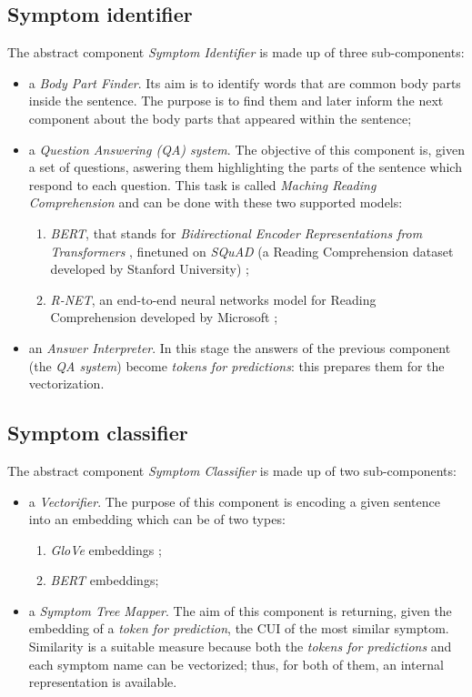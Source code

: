 \subsection*{Symptom identifier}
The abstract component \textit{Symptom Identifier} is made up of three sub-components:
\begin{itemize}
  \item a \textit{Body Part Finder}. Its aim is to identify words that are common body parts inside the sentence. The purpose is to find them and later inform the next component about the body parts that appeared within the sentence;
  \item a \textit{Question Answering (QA) system}. The objective of this component is, given a set of questions, aswering them highlighting the parts of the sentence which respond to each question. This task is called \textit{Maching Reading Comprehension} and can be done with these two supported models:
    \begin{enumerate}
      \item \textit{BERT}, that stands for \textit{Bidirectional Encoder Representations from Transformers} \cite{bert}, finetuned on \textit{SQuAD} (a Reading Comprehension dataset developed by Stanford University) \cite{squad};
      \item \textit{R-NET}, an end-to-end neural networks model for Reading Comprehension developed by Microsoft  \cite{rnet};
    \end{enumerate}
  \item an \textit{Answer Interpreter}. In this stage the answers of the previous component (the \textit{QA system}) become \textit{tokens for predictions}: this prepares them for the vectorization.
\end{itemize}

\subsection*{Symptom classifier}
The abstract component \textit{Symptom Classifier} is made up of two sub-components:
\begin{itemize}
  \item a \textit{Vectorifier}. The purpose of this component is encoding a given sentence into an embedding which can be of two types:
  \begin{enumerate}
    \item \textit{GloVe} embeddings \cite{glove};
    \item \textit{BERT} embeddings;
  \end{enumerate}
  \item a \textit{Symptom Tree Mapper}. The aim of this component is returning, given the embedding of a \textit{token for prediction}, the CUI of the most similar symptom. Similarity is a suitable measure because both the \textit{tokens for predictions} and each symptom name can be vectorized; thus, for both of them, an internal representation is available.
\end{itemize}

